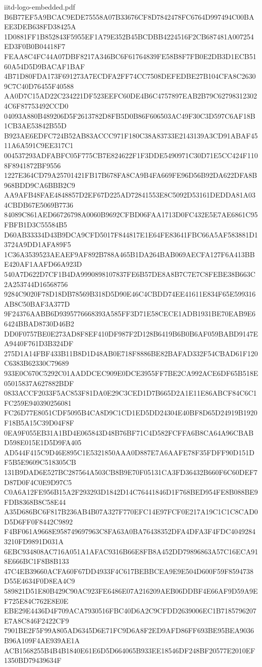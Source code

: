 \begin{filecontents*}[overwrite]{iitd-logo-embedded.pdf}
B6B77EF5A9BCAC9EDE75558A07B33676CF8D7842478FC6764D997494C00BAEE3DEB638FD38425A
1D0881FF1B852843F5955EF1A79E352B45BCDBB4224516F2CB687481A007254ED3F0B0B04418F7
FEAA8C4FC44A07DBF8217A346BC6F61764839FE58B8F7FB0E2DB3D1ECB5160A54D5D9BACAF1BAF
4B71D80FDA173F691273A7ECDFA2FF74CC7508DEFEDBE27B104CFA8C26309C7C40D76455F40588
AA0D7C15AD22C234221DF523EEFC60DE4B6C4757897EAB2B79C627983123024C6F87753492CCD0
04093A880B489206D5F2613782D8FB5D0B86F606503AC49F30C3D597C6AF18B1CB3AE53842B55D
B923AE6EDFC724B52AB83ACCC971F180C38A83733E2143139A3CD91ABAF4511A6A591C9EE317C1
004537293ADFABFC05F775CB7E824622F1F3DDE5490971C30D71E5CC424F1108F8941872BF9556
1227E364CD79A25701421FB17B678FA8CA9B4FA669FE96D56B92DA622DFA8B968BDD9CA6BBB2C9
AA9AFB48FAE4848857D2EF67D225AD72841553E8C5092D53161DEDDA81A034CBDB67E5069B7736
84089C861AED66726798A0060B9692CFBD06FAA1713D0FC432E5E7AE6861C95FBFB1D3C55584B5
D60AB33334D43B9DCA9CFD5017F844817E1E64FE83641FBC66A5AF583881D13724A9DD1AFA89F5
1C36A3539523AEAEF9AF892B788A465B1DA264BAB069AECFA127F6A413BBE420AF1AAFD66A923D
540A7D622D7CF1B4DA9990898107837FE6B57DE8A8B7C7E7C8FEBE38B663C2A253744D16568756
9284C9020F78D18DB78569B318D5D90E46C4CBDD74EE41611E834F65E599316AB8C50BAF3A377D
9F24376AABB6D9395776668393A585FF3D71E58CECE1ADB1931BE70EAB9E66424BBAD8730D46B2
DD0F0757BE0E273AD8F8EF410DF987F2D128B6419B6B0B6AF059BABD9147EA9440F761D3B324DF
275D1A14FBF433B11B8D1D48AB0E718F8886BE82BAFAD332F54CBAD61F120C6383B62330C79689
933E0C670C5292C01AADDCEC909E0DCE3955FF7BE2CA992ACE6DF65B518E05015837A627882BDF
0833ACCF2033F5AC853F81DA0E29C3CED1D7B665D2A1E11E86ABCF84C6C1FC259E940390256081
FC26D77E8051CDF5095B4CA8D9C1CD1ED5DD24304E40BF8D65D24919B1920F18B5A15C39D04F8F
0EA9F055EB31A1BD4E065843D48B76BF71C4D582FCFFA6B8CA64A96CBABD598E015E1D5D9FA405
AD544F415C9D46E895C1E5321850AAA0D887E7A6AAFE78F35FDFF90D151DF5B5E9609C518305CB
131B9DAD6E527BC287564A503CB8B9E70F05131CA3FD36432B660F6C60DEF7D87D0F4C0E9D97C5
C0A6A12FE956B15A2F293293D1842D14C76441846D1F768BED954FE8B088BE9FDB8368B8C58E44
A35D686BC6F817B236AB4B07A327F770EFC14E97FCF0E217A19C1C1C8CAD0D5D6FF0F8442C9892
F4BF061A9668E958749697963C8FA63A0BA76438352DFA4DFA3F4FDC40492843210FD9891D031A
6EBC934808AC716A051A1AFAC9316B66E8FB8A452DD79896863A57C16ECA918E666BC1F8B8B133
47C4EB39660ACFA60F67DD4933F4C617BEBBCEA9E9E504D600F59F8594738D55E4634F0D8EA4C9
589821D51E80B429C90AC923FE6486E07A216209AEB06DDBF4E66AF9D59A9EF725E84C762E8E0E
EBE29E4436D4F709ACA7930516FBC40D6A2C9CFDD2639006EC1B7185796207E7A8C846F2422CF9
7901BE2F5F99A805AD6345D6E71FC9D6A8F2ED9AFD86FF693BE95BEA9036B96A109F4AE939AE1A
ACB1568255B4B4B1840E61E6D5D664065B933EE18546DF248BF20577E2010EF1350BD79439634F

\end{filecontents*}
